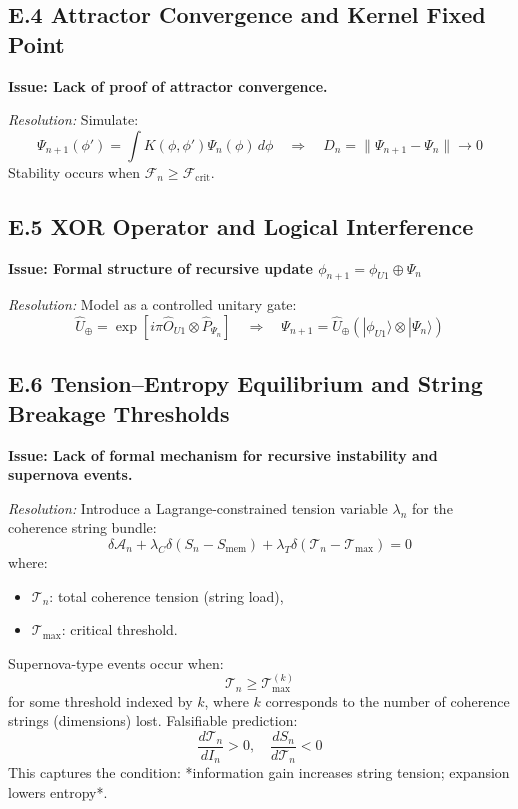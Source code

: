 \subsection*{E.4 Attractor Convergence and Kernel Fixed Point}

\textbf{Issue: Lack of proof of attractor convergence.}

\textit{Resolution:}  
Simulate:
\[
\Psi_{n+1}(\phi') = \int K(\phi, \phi') \Psi_n(\phi) \, d\phi
\quad \Rightarrow \quad
D_n = \|\Psi_{n+1} - \Psi_n\| \to 0
\]
Stability occurs when \( \mathcal{F}_n \geq \mathcal{F}_{\text{crit}} \).

\subsection*{E.5 XOR Operator and Logical Interference}

\textbf{Issue: Formal structure of recursive update \( \phi_{n+1} = \phi_{U1} \oplus \Psi_n \)}

\textit{Resolution:}  
Model as a controlled unitary gate:
\[
\hat{U}_\oplus = \exp[i\pi \hat{O}_{U1} \otimes \hat{P}_{\Psi_n}]
\quad \Rightarrow \quad
\Psi_{n+1} = \hat{U}_\oplus \left( |\phi_{U1}\rangle \otimes |\Psi_n\rangle \right)
\]

\subsection*{E.6 Tension–Entropy Equilibrium and String Breakage Thresholds}

\textbf{Issue: Lack of formal mechanism for recursive instability and supernova events.}

\textit{Resolution:}  
Introduce a Lagrange-constrained tension variable \( \lambda_n \) for the coherence string bundle:
\[
\delta \mathcal{A}_n + \lambda_C \delta(S_n - S_{\text{mem}}) + \lambda_T \delta(\mathcal{T}_n - \mathcal{T}_{\text{max}}) = 0
\]
where:
\begin{itemize}
  \item \( \mathcal{T}_n \): total coherence tension (string load),
  \item \( \mathcal{T}_{\text{max}} \): critical threshold.
\end{itemize}

Supernova-type events occur when:
\[
\mathcal{T}_n \geq \mathcal{T}_{\text{max}}^{(k)}
\]
for some threshold indexed by \( k \), where \( k \) corresponds to the number of coherence strings (dimensions) lost. Falsifiable prediction:
\[
\frac{d\mathcal{T}_n}{dI_n} > 0, \quad \frac{dS_n}{d\mathcal{T}_n} < 0
\]
This captures the condition: *information gain increases string tension; expansion lowers entropy*.

